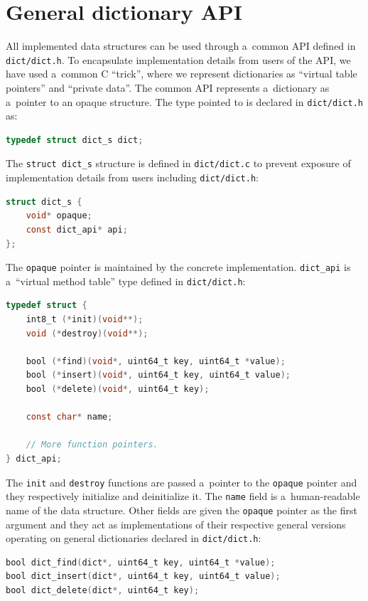\section{General dictionary API}
All implemented data structures can be used through a~common API defined
in \texttt{dict/dict.h}. To encapsulate implementation details from
users of the API, we have used a~common C ``trick'', where we represent
dictionaries as ``virtual table pointers'' and ``private data''.
The common API represents a~dictionary as a~pointer to an opaque structure.
The type pointed to is declared in \texttt{dict/dict.h} as:
\begin{lstlisting}[language=C]
typedef struct dict_s dict;
\end{lstlisting}

The \texttt{struct dict\_s} structure is defined in \texttt{dict/dict.c}
to prevent exposure of implementation details from users including
\texttt{dict/dict.h}:
\begin{lstlisting}[language=C]
struct dict_s {
	void* opaque;
	const dict_api* api;
};
\end{lstlisting}

The \texttt{opaque} pointer is maintained by the concrete implementation.
\texttt{dict\_api} is a~``virtual method table'' type defined in
\texttt{dict/dict.h}:

\begin{lstlisting}[language=C]
typedef struct {
	int8_t (*init)(void**);
	void (*destroy)(void**);

	bool (*find)(void*, uint64_t key, uint64_t *value);
	bool (*insert)(void*, uint64_t key, uint64_t value);
	bool (*delete)(void*, uint64_t key);

	const char* name;

	// More function pointers.
} dict_api;
\end{lstlisting}

The \texttt{init} and \texttt{destroy} functions are passed a~pointer to the
\texttt{opaque} pointer and they respectively initialize and deinitialize it.
The \texttt{name} field is a~human-readable name of the data structure.
Other fields are given the \texttt{opaque} pointer as the first argument
and they act as implementations of their respective general versions operating
on general dictionaries declared in \texttt{dict/dict.h}:

\begin{lstlisting}[language=C]
bool dict_find(dict*, uint64_t key, uint64_t *value);
bool dict_insert(dict*, uint64_t key, uint64_t value);
bool dict_delete(dict*, uint64_t key);
\end{lstlisting}

